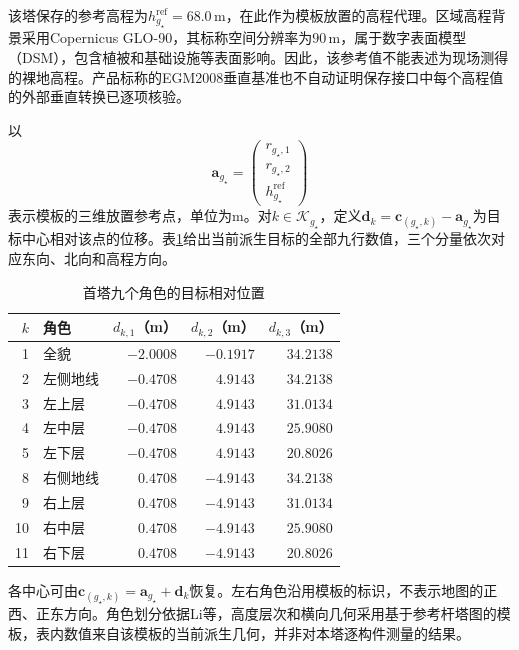 该塔保存的参考高程为$h_{g_\star}^{\mathrm{ref}}=68.0\,\mathrm m$，在此作为模板放置的高程代理。区域高程背景采用Copernicus GLO-90，其标称空间分辨率为$90\,\mathrm m$，属于数字表面模型（DSM），包含植被和基础设施等表面影响\cite{CopernicusDEM}。因此，该参考值不能表述为现场测得的裸地高程。产品标称的EGM2008垂直基准也不自动证明保存接口中每个高程值的外部垂直转换已逐项核验。

以
\begin{equation}
 \mathbf a_{g_\star}=
 \begin{pmatrix}
 r_{g_\star,1}\\r_{g_\star,2}\\h_{g_\star}^{\mathrm{ref}}
 \end{pmatrix}
\end{equation}
表示模板的三维放置参考点，单位为$\mathrm m$。对$k\in\mathcal K_{g_\star}$，定义$\mathbf d_k=\mathbf c_{(g_\star,k)}-\mathbf a_{g_\star}$为目标中心相对该点的位移。表\ref{s0401:task_attributes}给出当前派生目标的全部九行数值，三个分量依次对应东向、北向和高程方向。

\begin{table}[htbp]
 \centering
 \small
 \caption{首塔九个角色的目标相对位置}
 \label{s0401:task_attributes}
 \begin{tabular}{@{}rlrrr@{}}
  \toprule
  $k$ & 角色 & $d_{k,1}$（m） & $d_{k,2}$（m） & $d_{k,3}$（m）\\
  \midrule
  1  & 全貌     & $-2.0008$ & $-0.1917$ & $34.2138$\\
  2  & 左侧地线 & $-0.4708$ & $ 4.9143$ & $34.2138$\\
  3  & 左上层   & $-0.4708$ & $ 4.9143$ & $31.0134$\\
  4  & 左中层   & $-0.4708$ & $ 4.9143$ & $25.9080$\\
  5  & 左下层   & $-0.4708$ & $ 4.9143$ & $20.8026$\\
  8  & 右侧地线 & $ 0.4708$ & $-4.9143$ & $34.2138$\\
  9  & 右上层   & $ 0.4708$ & $-4.9143$ & $31.0134$\\
  10 & 右中层   & $ 0.4708$ & $-4.9143$ & $25.9080$\\
  11 & 右下层   & $ 0.4708$ & $-4.9143$ & $20.8026$\\
  \bottomrule
 \end{tabular}
\end{table}

各中心可由$\mathbf c_{(g_\star,k)}=\mathbf a_{g_\star}+\mathbf d_k$恢复。左右角色沿用模板的标识，不表示地图的正西、正东方向。角色划分依据Li等\cite{LiInspection2023}，高度层次和横向几何采用基于参考杆塔图的模板\cite{KPLC2025}，表内数值来自该模板的当前派生几何，并非对本塔逐构件测量的结果。


